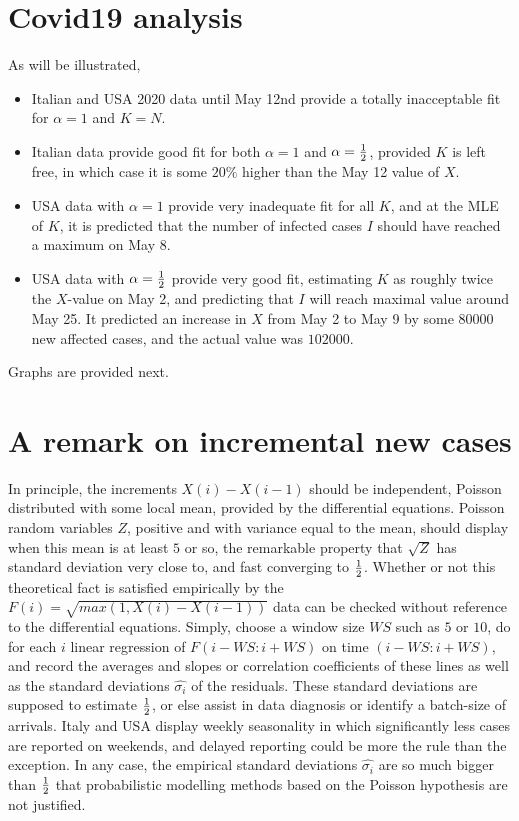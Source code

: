 \documentclass{article}
\begin{document}
\section{Covid19 analysis} \label{Covid19}

As will be illustrated,

\begin{itemize}

\item Italian and USA 2020 data until May 12nd provide a totally inacceptable fit for $\alpha=1$ and $K=N$.

\item Italian data provide good fit for both $\alpha=1$ and $\alpha={1 \over 2}$, provided $K$ is left free, in which case it is some $20\%$ higher than the May 12 value of $X$.

\item USA data with $\alpha=1$ provide very inadequate fit for all $K$, and at the MLE of $K$, it is predicted that the number of infected cases $I$ should have reached a maximum on May 8.

\item USA data with $\alpha={1 \over 2}$ provide very good fit, estimating $K$ as roughly twice the $X$-value on May 2, and predicting that $I$ will reach maximal value around May 25. It predicted an increase in $X$ from May 2 to May 9 by some $80000$ new affected cases, and the actual value was $102000$.

\end{itemize}

Graphs are provided next.

\section{A remark on incremental new cases} \label{More}

In principle, the increments $X(i)-X(i-1)$ should be independent, Poisson distributed with some local mean, provided by the differential equations. Poisson random variables $Z$, positive and with variance equal to the mean, should display when this mean is at least $5$ or so, the remarkable property that $\sqrt{Z}$ has standard deviation very close to, and fast converging to ${1 \over 2}$. Whether or not this theoretical fact is satisfied empirically by the $F(i)=\sqrt{max(1,X(i)-X(i-1))}$ data can be checked without reference to the differential equations. Simply, choose a window size $WS$ such as $5$ or $10$, do for each $i$ linear regression of $F(i-WS:i+WS)$ on time $(i-WS:i+WS)$, and record the averages and slopes or correlation coefficients of these lines as well as the standard deviations $\hat{\sigma_i}$ of the residuals. These standard deviations are supposed to estimate ${1 \over 2}$, or else assist in data diagnosis or identify a batch-size of arrivals. Italy and USA display weekly seasonality in which significantly less cases are reported on weekends, and delayed reporting could be more the rule than the exception. In any case, the empirical standard deviations $\hat{\sigma_i}$ are so much bigger than ${1 \over 2}$ that probabilistic modelling methods based on the Poisson hypothesis are not justified.
\end{document}
